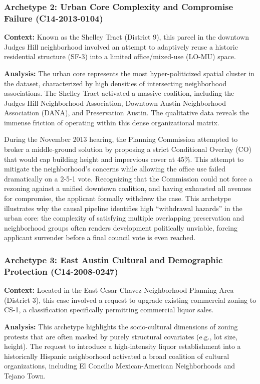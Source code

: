 \subsubsection[Archetype 2: Urban Core Complexity and Compromise Failure]{Archetype 2: Urban Core Complexity and Compromise Failure (C14-2013-0104)}
\textbf{Context:} Known as the Shelley Tract (District 9), this parcel in the downtown Judges Hill neighborhood involved an attempt to adaptively reuse a historic residential structure (SF-3) into a limited office/mixed-use (LO-MU) space.

\textbf{Analysis:} The urban core represents the most hyper-politicized spatial cluster in the dataset, characterized by high densities of intersecting neighborhood associations. The Shelley Tract activated a massive coalition, including the Judges Hill Neighborhood Association, Downtown Austin Neighborhood Association (DANA), and Preservation Austin. The qualitative data reveals the immense friction of operating within this dense organizational matrix.

During the November 2013 hearing, the Planning Commission attempted to broker a middle-ground solution by proposing a strict Conditional Overlay (CO) that would cap building height and impervious cover at $45\%$. This attempt to mitigate the neighborhood's concerns while allowing the office use failed dramatically on a 2-5-1 vote. Recognizing that the Commission could not force a rezoning against a unified downtown coalition, and having exhausted all avenues for compromise, the applicant formally withdrew the case. This archetype illustrates why the causal pipeline identifies high ``withdrawal hazards'' in the urban core: the complexity of satisfying multiple overlapping preservation and neighborhood groups often renders development politically unviable, forcing applicant surrender before a final council vote is even reached.

\subsubsection[Archetype 3: East Austin Cultural and Demographic Protection]{Archetype 3: East Austin Cultural and Demographic Protection (C14-2008-0247)}
\textbf{Context:} Located in the East Cesar Chavez Neighborhood Planning Area (District 3), this case involved a request to upgrade existing commercial zoning to CS-1, a classification specifically permitting commercial liquor sales.

\textbf{Analysis:} This archetype highlights the socio-cultural dimensions of zoning protests that are often masked by purely structural covariates (e.g., lot size, height). The request to introduce a high-intensity liquor establishment into a historically Hispanic neighborhood activated a broad coalition of cultural organizations, including El Concilio Mexican-American Neighborhoods and Tejano Town. 

